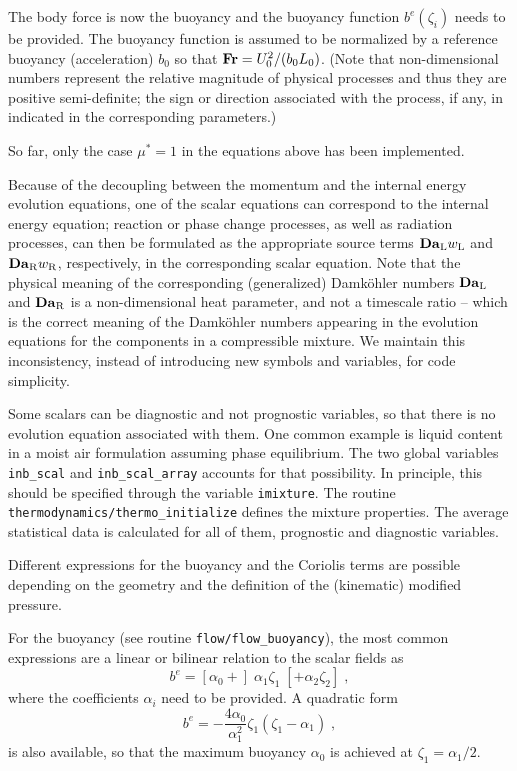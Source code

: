 The body force is now the buoyancy and the buoyancy function $b^e(\zeta_i)$
needs to be provided. The buoyancy function is assumed to be normalized by a
reference buoyancy (acceleration) $b_0$ so that $\mathrm{\bf
  Fr}=U_0^2/(b_0L_0)$. (Note that non-dimensional numbers represent the relative
magnitude of physical processes and thus they are positive semi-definite; the
sign or direction associated with the process, if any, in indicated in the
corresponding parameters.)

So far, only the case $\mu^*=1$ in the equations above has been implemented.

Because of the decoupling between the momentum and the internal energy evolution
equations, one of the scalar equations can correspond to the internal energy
equation; reaction or phase change processes, as well as radiation processes,
can then be formulated as the appropriate source terms $\mathrm{\bf
  Da}_\mathrm{L}w_\mathrm{L}$ and $\mathrm{\bf Da}_\mathrm{R}w_\mathrm{R}$,
respectively, in the corresponding scalar equation. Note that the physical
meaning of the corresponding (generalized) Damk{\"o}hler numbers $\mathrm{\bf
  Da}_\mathrm{L}$ and $\mathrm{\bf Da}_\mathrm{R}$ is a non-dimensional heat
parameter, and not a timescale ratio -- which is the correct meaning of the
Damk{\"o}hler numbers appearing in the evolution equations for the components in
a compressible mixture. We maintain this inconsistency, instead of introducing
new symbols and variables, for code simplicity.

Some scalars can be diagnostic and not prognostic variables, so that there is no
evolution equation associated with them. One common example is liquid content in
a moist air formulation assuming phase equilibrium. The two global variables
{\tt inb\_scal} and {\tt inb\_scal\_array} accounts for that possibility. In
principle, this should be specified through the variable {\tt imixture}. The
routine {\tt thermodynamics/thermo\_initialize} defines the mixture
properties. The average statistical data is calculated for all of them,
prognostic and diagnostic variables.

Different expressions for the buoyancy and the Coriolis terms are possible
depending on the geometry and the definition of the (kinematic) modified
pressure. 

For the buoyancy (see routine {\tt flow/flow\_buoyancy}), the most common
expressions are a linear or bilinear relation to the scalar fields as
\begin{equation}
b^e=[\alpha_0+]\;\alpha_1\zeta_1\; [+\alpha_2\zeta_2] \;,
\end{equation}
where the coefficients $\alpha_i$ need to be provided. A quadratic form 
\begin{equation}
b^e=-\frac{4\alpha_0}{\alpha_1^2}\zeta_1(\zeta_1-\alpha_1) \;,
\end{equation}
is also available, so that the maximum buoyancy $\alpha_0$ is achieved at
$\zeta_1=\alpha_1/2$. 

